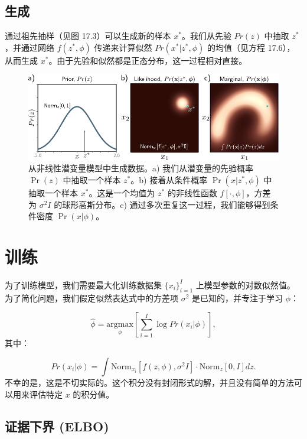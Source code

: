 \documentclass[lang=cn,newtx,10pt,scheme=chinese]{elegantbook}
\begin{document}
\subsection{生成}

通过祖先抽样（见图 17.3）可以生成新的样本 \(x^*\)。我们从先验 \(Pr(z)\) 中抽取 \(z^*\)，并通过网络 \(f(z^*, \phi)\) 传递来计算似然 \(Pr(x^*|z^*, \phi)\) 的均值（见方程 17.6），从而生成 \(x^*\)。由于先验和似然都是正态分布，这一过程相对直接。

\begin{figure}[ht!]
\centering
\includegraphics[width=0.7\linewidth]{PDFFigures/UDLChap17PDF/VAENonLinearLVMGen.pdf}
\caption{从非线性潜变量模型中生成数据。a) 我们从潜变量的先验概率 \( \Pr(z) \) 中抽取一个样本 \( z^* \)。b) 接着从条件概率 \( \Pr(x|z^*, \phi) \) 中抽取一个样本 \( x^* \)。这是一个均值为 \( z^* \) 的非线性函数 \( f[\cdot, \phi] \)，方差为 \( \sigma^2 I \) 的球形高斯分布。c) 通过多次重复这一过程，我们能够得到条件密度 \( \Pr(x|\phi) \)。}
\end{figure}


\section{训练}

为了训练模型，我们需要最大化训练数据集 \(\{x_i\}_{i=1}^I\) 上模型参数的对数似然值。为了简化问题，我们假定似然表达式中的方差项 \(\sigma^2\) 是已知的，并专注于学习 \(\phi\)：

\begin{equation}
\hat{\phi} = \underset{\phi}{\mathrm{argmax}} \left[ \sum_{i=1}^I \log Pr(x_i|\phi) \right], 
\end{equation}
其中：

\begin{equation}
Pr(x_i|\phi) = \int \text{Norm}_{x_i} \left[ f(z, \phi), \sigma^2 I \right] \cdot \text{Norm}_z [0, I] dz. 
\end{equation}
不幸的是，这是不切实际的。这个积分没有封闭形式的解，并且没有简单的方法可以用来评估特定 \(x\) 的积分值。

\subsection{证据下界 (ELBO)}
\end{document}
